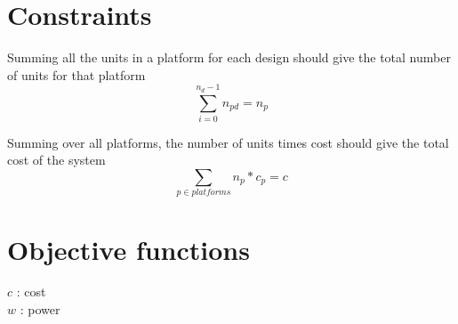 \documentclass[11pt,letterpaper]{article}
\begin{document}
\section{Constraints}



Summing all the units in a platform for each design should give the total number of units for that platform
$$ \sum_{i=0}^{n_d-1} n_{pd} = n_{p}$$

Summing over all platforms, the number of units times cost should give the total cost of the system
$$ \sum_{p \in platforms} n_p * c_p = c $$

\section{Objective functions}

$c$ : cost \\
$w$ : power \\
\end{document}
